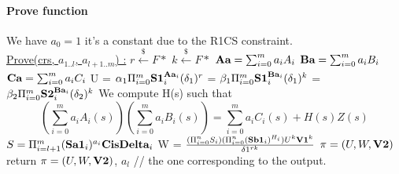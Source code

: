 \paragraph{Prove function}
We have $a_0 = 1$ it's a constant due to the R1CS constraint. \\
\underline{Prove(crs, $a_{1..l}$, $a_{l+1..m}$) :}
\tabNormal $r \xleftarrow[]{\$}F*$
\tabNormal $k \xleftarrow[]{\$}F*$
\tabNormal $\textbf{Aa} =\sum_{i=0}^m a_i A_i$
\tabNormal $\textbf{Ba}=\sum_{i=0}^m a_i B_i$
\tabNormal $\textbf{Ca} =\sum_{i=0}^m a_i C_i$
\tabNormal U = $\textbf{$\alpha_1$} \Pi_{i=0}^{m} \textbf{S1}_i^{\textbf{Aa}_i} (\textbf{$\delta_1$})^r $
\tabNormal \VOne = $\textbf{$\beta_1$} \Pi_{i=0}^{m} \textbf{S1}_i^{\textbf{Ba}_i} (\textbf{$\delta_1$})^k $
\tabNormal \VTwo = $\textbf{$\beta_2$} \Pi_{i=0}^{m} \textbf{S2}_i^{\textbf{Ba}_i} (\textbf{$\delta_2$})^k $
\tabNormal We compute H(s) such that  \[ (\sum_{i=0}^m a_i A_i(s)) (\sum_{i=0}^m a_i B_i(s)) = \sum_{i=0}^m a_i C_i(s) + H(s) Z(s) \]
\tabNormal $S=\Pi_{i=l+1}^{m}(\textbf{Sa1}_i)^{a_i} \textbf{CisDelta}_i$
\tabNormal W = $\frac{(\Pi_{i=0}^n S_i) (\Pi_{i=0}^n (\textbf{Sb1}_i)^{H_i}) U^k \textbf{V1}^k}{\delta1^{rk}} $
\tabNormal $\pi=(U, W, \textbf{V2})$ 
\tabNormal return $\pi=(U, W, \textbf{V2})$, $a_l$ // the one corresponding to the output.
